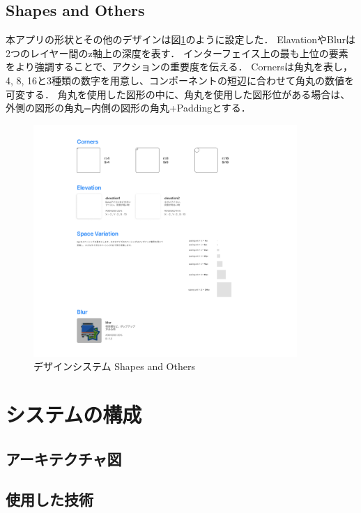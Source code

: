 \subsection{Shapes and Others}
    本アプリの形状とその他のデザインは図\ref{fig:shapes}のように設定した．
    ElavationやBlurは2つのレイヤー間のz軸上の深度を表す．
    インターフェイス上の最も上位の要素をより強調することで、アクションの重要度を伝える．
    Cornersは角丸を表し，4, 8, 16と3種類の数字を用意し、コンポーネントの短辺に合わせて角丸の数値を可変する．
    角丸を使用した図形の中に、角丸を使用した図形位がある場合は、
    外側の図形の角丸=内側の図形の角丸+Paddingとする．
    \pagebreak
    \begin{figure}
        \centering
        \includegraphics[width=10cm]{images/shapes.png}
        \caption{デザインシステム Shapes and Others}
        \label{fig:shapes}
    \end{figure}

\section{システムの構成}
\subsection{アーキテクチャ図}
\subsection{使用した技術}
\bunseki{}
